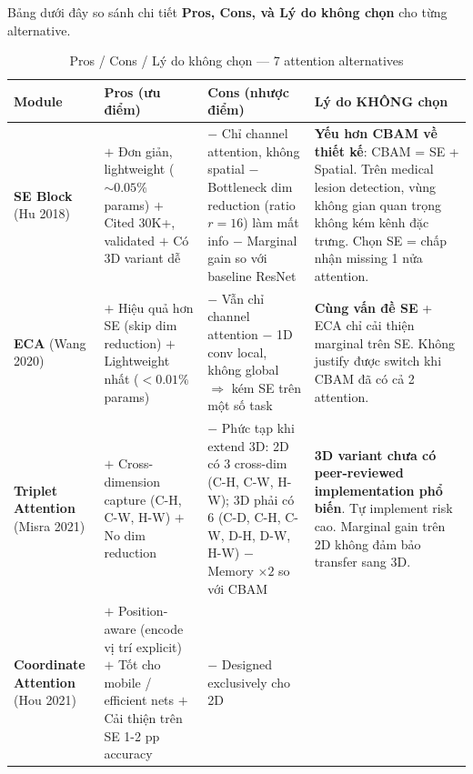 \documentclass[11pt,a4paper]{article}
\newcommand{\bad}[1]{\textcolor{bad}{#1}}
\begin{document}
\noindent Bảng dưới đây so sánh chi tiết \textbf{Pros, Cons, và Lý do
không chọn} cho từng alternative.

\begin{longtable}{@{}p{2.2cm}p{4.2cm}p{4.2cm}p{4cm}@{}}
\caption{Pros / Cons / Lý do không chọn — 7 attention alternatives}
\label{tab:attn_proscons}\\
\toprule
\rowcolor{tablehdr}
Module & Pros (ưu điểm) & Cons (nhược điểm) & Lý do KHÔNG chọn \\
\midrule
\endfirsthead
\bottomrule
\endlastfoot
\textbf{SE Block} (Hu 2018) &
$+$ Đơn giản, lightweight ($\sim 0.05\%$ params) \newline
$+$ Cited 30K+, validated \newline
$+$ Có 3D variant dễ
&
$-$ \bad{Chỉ channel attention}, không spatial \newline
$-$ Bottleneck dim reduction (ratio $r=16$) làm mất info \newline
$-$ Marginal gain so với baseline ResNet
&
\textbf{Yếu hơn CBAM về thiết kế}: CBAM = SE + Spatial. Trên medical
lesion detection, vùng không gian quan trọng không kém kênh đặc trưng.
Chọn SE = chấp nhận missing 1 nửa attention. \\
\midrule
\textbf{ECA} (Wang 2020) &
$+$ Hiệu quả hơn SE (skip dim reduction) \newline
$+$ Lightweight nhất ($<0.01\%$ params)
&
$-$ \bad{Vẫn chỉ channel attention} \newline
$-$ 1D conv local, không global $\Rightarrow$ kém SE trên một số task
&
\textbf{Cùng vấn đề SE} + ECA chỉ cải thiện marginal trên SE.
Không justify được switch khi CBAM đã có cả 2 attention. \\
\midrule
\textbf{Triplet Attention} (Misra 2021) &
$+$ Cross-dimension capture (C-H, C-W, H-W) \newline
$+$ No dim reduction
&
$-$ \bad{Phức tạp khi extend 3D}: 2D có 3 cross-dim (C-H, C-W, H-W); 3D
phải có 6 (C-D, C-H, C-W, D-H, D-W, H-W) \newline
$-$ Memory $\times 2$ so với CBAM
&
\textbf{3D variant chưa có peer-reviewed implementation phổ biến}.
Tự implement risk cao. Marginal gain trên 2D không đảm bảo transfer
sang 3D. \\
\midrule
\textbf{Coordinate Attention} (Hou 2021) &
$+$ Position-aware (encode vị trí explicit) \newline
$+$ Tốt cho mobile / efficient nets \newline
$+$ Cải thiện trên SE 1-2 pp accuracy
&
$-$ \bad{Designed exclusively cho 2D} \newline

\end{longtable}
\end{document}
